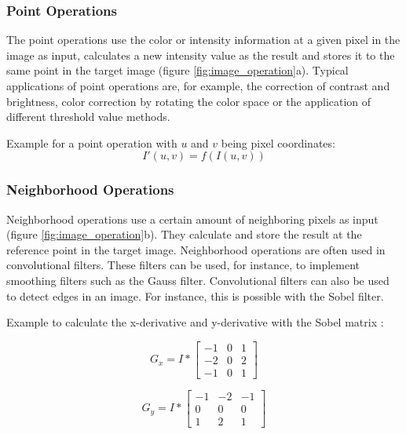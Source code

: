 \subsubsection*{Point Operations}
The point operations use the color or intensity information at a given pixel in the image as input, calculates a new intensity value as the result and stores it to the same point in the target image (figure \ref{fig:image_operation}a). Typical applications of point operations are, for example, the correction of contrast and brightness, color correction by rotating the color space or the application of different threshold value methods.

Example for a point operation with $u$ and $v$ being pixel coordinates:
\begin{equation}
    I'(u, v) = f(I(u, v))
    \label{eq:point_operation}
\end{equation}


\subsubsection*{Neighborhood Operations} \label{ch:th:neighborhood}
Neighborhood operations use a certain amount of neighboring pixels as input (figure \ref{fig:image_operation}b).
They calculate and store the result at the reference point in the
target image. Neighborhood operations are often used in convolutional filters.
These
filters can be used, for instance, to implement smoothing filters such as the
Gauss filter. Convolutional filters can also be used to detect edges in an
image. For instance, this is possible with the Sobel filter.

Example to calculate the x-derivative and y-derivative with the Sobel matrix \cite{sobel_matrix}:

\vspace{1ex}
\noindent\begin{minipage}{.5\linewidth}
\begin{equation}
    G_{x} = I * \begin{bmatrix}
                -1 & 0 & 1 \\ 
                -2 & 0 & 2 \\ 
                -1 & 0 & 1
                \end{bmatrix}
    \label{eq:neighborhood_operation1}
\end{equation}

\end{minipage}%
\begin{minipage}{.5\linewidth}

\begin{equation}
    G_{y} = I * \begin{bmatrix}
                -1 & -2 & -1 \\ 
                0 & 0 & 0 \\ 
                1 & 2 & 1
                \end{bmatrix}
    \label{eq:neighborhood_operation2}
\end{equation} 

\end{minipage}\\
\vspace{1ex}

